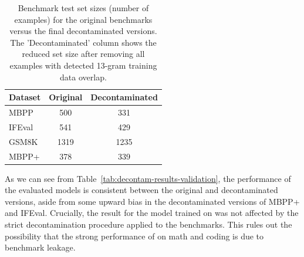 \begin{table}[htb]
\caption{Benchmark test set sizes (number of examples) for the original benchmarks versus the final decontaminated versions. The 'Decontaminated' column shows the reduced set size after removing all examples with detected 13-gram training data overlap.}
\centering
\begin{tabular}{lcc}
\toprule
\textbf{Dataset} & \textbf{Original} & \textbf{Decontaminated} \\
\midrule
MBPP        & 500  & 331 \\
IFEval      & 541  & 429 \\
GSM8K       & 1319 & 1235 \\
MBPP+       & 378  & 339 \\
\bottomrule
\end{tabular}

\label{tab:decontam-sizes}
\end{table}


As we can see from Table~\ref{tab:decontam-results-validation}, the performance of the evaluated models is consistent between the original and decontaminated versions, aside from some upward bias in the decontaminated versions of MBPP+ and IFEval. Crucially, the result for the model trained on \MixtureVitae{} was not affected by the strict decontamination procedure applied to the benchmarks. This rules out the possibility that the strong performance of \MixtureVitae{} on math and coding is due to  benchmark leakage.

